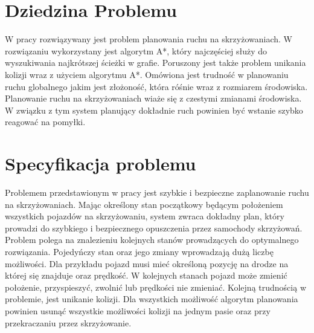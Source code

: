 
\section{Dziedzina Problemu}

W pracy rozwiązywany jest problem planowania ruchu na skrzyżowaniach.
\newline
\newline
W rozwiązaniu wykorzystany jest algorytm A*, który najczęściej służy do wyszukiwania najkrótszej ścieżki w grafie.
\newline
\newline
Poruszony jest także problem unikania kolizji wraz z użyciem algorytmu A*.
\newline
\newline
Omówiona jest trudność w planowaniu ruchu globalnego jakim jest złożoność, która róśnie wraz z rozmiarem środowiska.
\newline
\newline
Planowanie ruchu na skrzyżowaniach wiaże się z czestymi zmianami środowiska. W związku z tym system planujący dokładnie ruch powinien być wstanie szybko reagować na pomyłki.

\section{Specyfikacja problemu}

Problemem przedstawionym w pracy jest szybkie i bezpieczne zaplanowanie ruchu na skrzyżowaniach. 
\newline
\newline
Mając określony stan początkowy będącym położeniem wszystkich pojazdów na skrzyżowaniu, system zwraca dokładny plan, który prowadzi do szybkiego i bezpiecznego opuszczenia przez samochody skrzyżowań.
\newline
\newline
Problem polega na znalezieniu kolejnych stanów prowadzących do optymalnego rozwiązania. Pojedyńczy stan oraz jego zmiany wprowadzają dużą liczbę możliwości.
\newline
\newline
Dla przykładu pojazd musi mieć określoną pozycję na drodze na której się znajduje oraz prędkość. W kolejnych stanach pojazd może zmienić położenie, przyspieszyć, zwolnić lub prędkości nie zmieniać.
\newline
\newline
Kolejną trudnością w problemie, jest unikanie kolizji. Dla wszystkich możliwość algorytm planowania powinien usunąć wszystkie możliwości kolizji na jednym pasie oraz przy przekraczaniu przez skrzyżowanie.

